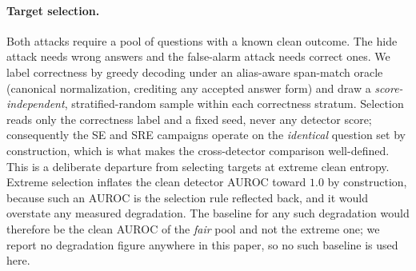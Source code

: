 \paragraph{Target selection.}
Both attacks require a pool of questions with a known clean outcome. The hide attack needs
wrong answers and the false-alarm attack needs correct ones. We label
correctness by greedy decoding under an alias-aware span-match oracle (canonical
normalization, crediting any accepted answer form) and draw a
\emph{score-independent}, stratified-random sample within each correctness
stratum. Selection reads only the correctness label and a fixed seed, never any
detector score; consequently the SE and SRE campaigns operate on the
\emph{identical} question set by construction, which is what makes the
cross-detector comparison well-defined. This is a deliberate departure from
selecting targets at extreme clean entropy. Extreme selection inflates the clean
detector AUROC toward $1.0$ by construction, because such an AUROC is the selection rule
reflected back, and it would overstate any measured degradation. The baseline for any such
degradation would therefore be the clean AUROC of the \emph{fair} pool and not the extreme
one; we report no degradation figure anywhere in this paper, so no such baseline is used
here.


